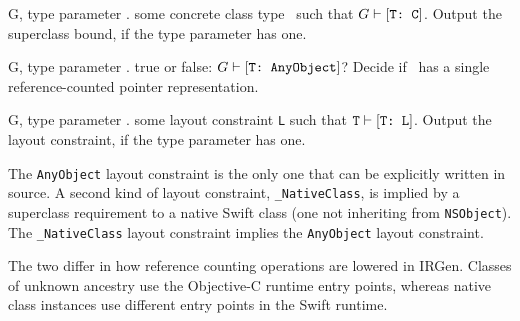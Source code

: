 \documentclass[../generics]{subfiles}
\begin{document}
\begin{itemize}
{G, \tT}
{type parameter \tT.}
{some concrete class type \tC\ such that $G\vdash[\texttt{T:~C}]$.}
{Output the superclass bound, if the type parameter has one.}

{G, \tT}
{type parameter \tT.}
{true or false: $G\vdash[\texttt{T:~AnyObject}]$?}
{Decide if \tT\ has a single reference-counted pointer representation.}

{G, \tT}
{type parameter \tT.}
{some layout constraint \texttt{L} such that $\texttt{T}\vdash[\texttt{T:~L}]$.}
{Output the layout constraint, if the type parameter has one.}

The \texttt{AnyObject} layout constraint is the only one that can be explicitly written in source. A second kind of layout constraint, \verb|_NativeClass|, is implied by a superclass requirement to a native Swift class (one not inheriting from \texttt{NSObject}). The \verb|_NativeClass| layout constraint implies the \texttt{AnyObject} layout constraint.

The two differ in how reference counting operations are lowered in IRGen. Classes of unknown ancestry use the Objective-C runtime entry points, whereas native class instances use different entry points in the Swift runtime.
\end{itemize}
\end{document}
